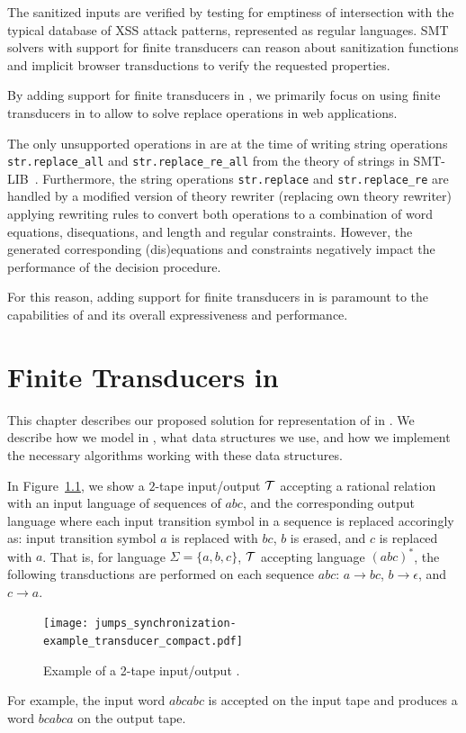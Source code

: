The sanitized inputs are verified by testing for emptiness of intersection with the typical database of XSS attack patterns, represented as regular languages.
SMT solvers with support for finite transducers can reason about sanitization functions and implicit browser transductions to verify the requested properties.

By adding support for finite transducers in \mata, we primarily focus on using finite transducers in \noodler to allow \noodler to solve replace operations in web applications.

The only unsupported operations in \noodler are at the time of writing string operations \texttt{str.replace\_all} and \texttt{str.replace\_re\_all} from the theory of strings in SMT-LIB~\cite{smtlib_theory_strings}.
Furthermore, the string operations \texttt{str.replace} and \texttt{str.replace\_re} are handled by a modified \noodler version of theory rewriter (replacing \ziii own theory rewriter) applying rewriting rules to convert both operations to a combination of word equations, disequations, and length and regular constraints.
However, the generated corresponding (dis)equations and constraints negatively impact the performance of the decision procedure.

For this reason, adding support for finite transducers in \mata is paramount to the capabilities of \noodler and its overall expressiveness and performance.

\chapter{Finite Transducers in \mata}

This chapter describes our proposed solution for representation of \nfts in \mata. We describe how we model \nfts in \mata, what data structures we use, and how we implement the necessary algorithms working with these data structures.

\begin{example}\label{example:2_tape_nft}
In Figure~\ref{fig:2_tape_nft}, we show a $2$-tape input/output \nft $\mathcal{T}$ accepting a rational relation with an input language of sequences of $abc$, and the corresponding output language where each input transition symbol in a sequence is replaced accoringly as: input transition symbol $a$ is replaced with $bc$, $b$ is erased, and $c$ is replaced with $a$.
That is, for language $\Sigma = \{ a, b, c \}$, $\mathcal{T}$ accepting language $(abc)^*$, the following transductions are performed on each sequence $abc$:
$a \rightarrow bc$,
$b \rightarrow \epsilon$, and
$c \rightarrow a$.

\begin{figure}[!ht]
  \centering
    \texttt{[image: jumps\_synchronization-example\_transducer\_compact.pdf]}
  \caption{
    Example of a 2-tape input/output \nft.
  }\label{fig:2_tape_nft}
\end{figure}

For example, the input word $abcabc$ is accepted on the input tape and produces a word $bcabca$ on the output tape.

\end{example}

